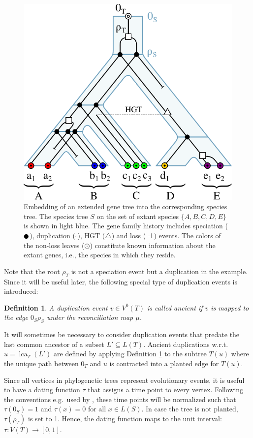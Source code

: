 \documentclass[hidelinks,11pt]{scrreprt}
\DeclareMathOperator{\lca}{lca}
\newtheorem{definition}[theorem]{Definition}
\newcommand{\LEAF}{\odot}
\newcommand{\SPEC}{\newmoon}
\newcommand{\HGT}{\triangle}
\newcommand{\DUPL}{\square}
\begin{document}
\vspace{5mm}
\begin{figure}[ht]
	\begin{center}     
		\includegraphics[width=0.55\columnwidth]{embedded_tree.pdf}
	\end{center}
	\caption[Embedding of an extended gene tree into the corresponding species tree]{Embedding of an extended gene tree into the corresponding species tree. The species tree $S$ on the set of extant species $\{A,B,C,D,E\}$ is shown in light blue. The gene family history includes speciation ($\SPEC$), duplication ($\DUPL$), HGT ($\HGT$) and loss ($\dashv$) events. The colors of the non-loss leaves ($\LEAF$) constitute known information about the extant genes, i.e., the species in which they reside.}
	\label{fig:embedded_tree}
\end{figure}

Note that the root $\rho_T$ is not a speciation event but a duplication in the example. Since it will be useful later, the following special type of duplication events is introduced:

\begin{definition}
	\label{def:ancient_dupl}
	A duplication event $v\in V^0(T)$ is called \emph{ancient} if $v$ is
	mapped to the edge $0_S\rho_S$ under the reconciliation map $\mu$.
\end{definition}
It will sometimes be necessary to consider duplication events that predate the last common ancestor of a subset $L' \subseteq L(T)$. Ancient duplications w.r.t.\ $u=\lca_T(L')$ are defined by applying Definition \ref{def:ancient_dupl} to the subtree $T(u)$ where the unique path between $0_T$ and $u$ is contracted into a planted edge for $T(u)$.

Since all vertices in phylogenetic trees represent evolutionary events, it is useful to have a dating function $\tau$ that assigns a time point to every vertex. Following the conventions e.g.\ used by \citet{bocker1998}, these time points will be normalized such that $\tau(0_S)=1$ and $\tau(x)=0$ for all $x \in L(S)$. In case the tree is not planted, $\tau(\rho_T)$ is set to 1. Hence, the dating function maps to the unit interval: $\tau\colon V(T) \to [0,1]$. 
\end{document}
